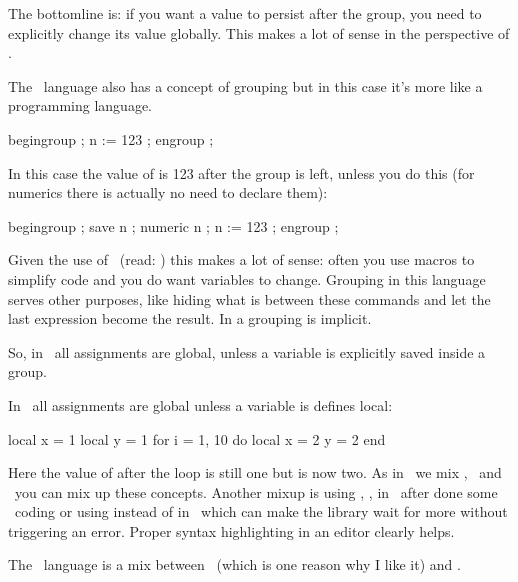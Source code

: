 \starttyping
\bgroup
\endgroup
\stoptyping

The bottomline is: if you want a value to persist after the group, you need to
explicitly change its value globally. This makes a lot of sense in the perspective
of \TEX.

\stopsectionlevel

\startsectionlevel[title=\METAPOST]

The \METAPOST\ language also has a concept of grouping but in this case it's more like a
programming language.

\starttyping
begingroup ;
    n := 123 ;
engroup ;
\stoptyping

In this case the value of  is 123 after the group is left, unless you do
this (for numerics there is actually no need to declare them):

\starttyping
begingroup ;
    save n ; numeric n ; n := 123 ;
engroup ;
\stoptyping

Given the use of \METAPOST\ (read: \METAFONT) this makes a lot of sense: often
you use macros to simplify code and you do want variables to change. Grouping in
this language serves other purposes, like hiding what is between these commands
and let the last expression become the result. In a  grouping is
implicit.

So, in \METAPOST\ all assignments are global, unless a variable is explicitly
saved inside a group.

\stopsectionlevel

\startsectionlevel[title=\LUA]

In \LUA\ all assignments are global unless a variable is defines local:

\starttyping
local x = 1
local y = 1
for i = 1, 10 do
    local x = 2
    y = 2
end
\stoptyping

Here the value of  after the loop is still one but  is now two.
As in \LUATEX\ we mix \TEX, \METAPOST\ and \LUA\ you can mix up these concepts.
Another mixup is using \type {:=}, ,  in \LUA\ after done
some \METAPOST\ coding or using  instead of  in
\METAPOST\ which can make the library wait for more without triggering an error.
Proper syntax highlighting in an editor clearly helps.

\stopsectionlevel

\startsectionlevel[title=\CCODE]

The \LUA\ language is a mix between \PASCAL\ (which is one reason why I like it)
and \CCODE.

